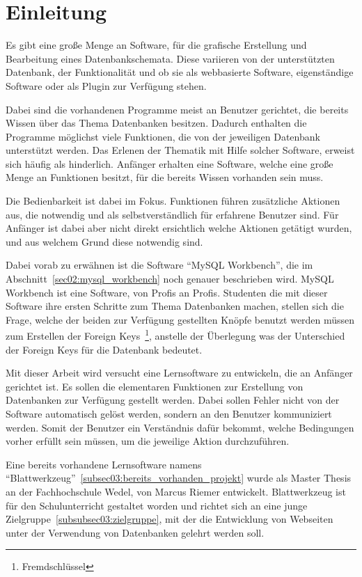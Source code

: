 \section{Einleitung}
\label{sec:introduction}

Es gibt eine große Menge an Software, für die grafische Erstellung und Bearbeitung eines Datenbankschemata. Diese variieren von der unterstützten Datenbank, der Funktionalität und ob sie als webbasierte Software, eigenständige Software oder als Plugin zur Verfügung stehen.

Dabei sind die vorhandenen Programme meist an Benutzer gerichtet, die bereits Wissen über das Thema Datenbanken besitzen. 
Dadurch enthalten die Programme möglichst viele Funktionen, die von der jeweiligen Datenbank unterstützt werden. Das Erlenen der Thematik mit Hilfe solcher Software, erweist sich häufig als hinderlich. Anfänger erhalten eine Software, welche eine große Menge an Funktionen besitzt, für die bereits Wissen vorhanden sein muss.

Die Bedienbarkeit ist dabei im Fokus. Funktionen führen zusätzliche Aktionen aus, die notwendig und als selbstverständlich für erfahrene Benutzer sind. Für Anfänger ist dabei aber nicht direkt ersichtlich welche Aktionen getätigt wurden, und aus welchem Grund diese notwendig sind.

Dabei vorab zu erwähnen ist die Software ``MySQL Workbench'', die im Abschnitt~\ref{sec02:mysql_workbench} noch genauer beschrieben wird. MySQL Workbench ist eine Software, von Profis an Profis. Studenten die mit dieser Software ihre ersten Schritte zum Thema Datenbanken machen, stellen sich die Frage, welche der beiden zur Verfügung gestellten Knöpfe benutzt werden müssen zum Erstellen der Foreign Keys~\footnote{Fremdschlüssel}, anstelle der Überlegung was der Unterschied der Foreign Keys für die Datenbank bedeutet.

Mit dieser Arbeit wird versucht eine Lernsoftware zu entwickeln, die an Anfänger gerichtet ist. Es sollen die elementaren Funktionen zur Erstellung von Datenbanken zur Verfügung gestellt werden. Dabei sollen Fehler  nicht von der Software automatisch gelöst werden, sondern an den Benutzer kommuniziert werden. Somit der Benutzer ein Verständnis dafür bekommt, welche Bedingungen vorher erfüllt sein müssen, um die jeweilige Aktion durchzuführen.

Eine bereits vorhandene Lernsoftware namens ``Blattwerkzeug''~\ref{subsec03:bereits_vorhanden_projekt} wurde als Master Thesis an der Fachhochschule Wedel, von Marcus Riemer entwickelt. Blattwerkzeug ist für den Schulunterricht gestaltet worden und richtet sich an eine junge Zielgruppe~\ref{subsubsec03:zielgruppe}, mit der die Entwicklung von Webseiten unter der Verwendung von Datenbanken gelehrt werden soll. 

